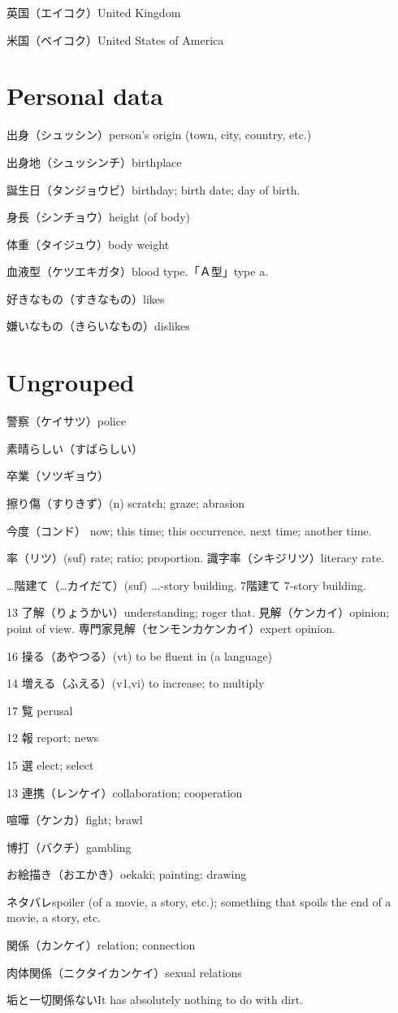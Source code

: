 英国（エイコク）United Kingdom

米国（ベイコク）United States of America

\section{Personal data}

出身（シュッシン）person's origin (town, city, country, etc.)

出身地（シュッシンチ）birthplace

誕生日（タンジョウビ）birthday; birth date; day of birth.

身長（シンチョウ）height (of body)

体重（タイジュウ）body weight

血液型（ケツエキガタ）blood type.「Ａ型」type a.

好きなもの（すきなもの）likes

嫌いなもの（きらいなもの）dislikes

\section{Ungrouped}

警察（ケイサツ）police

素晴らしい（すばらしい）

卒業（ソツギョウ）

擦り傷（すりきず）(n) scratch; graze; abrasion

今度（コンド）
now; this time; this occurrence.
next time; another time.

率（リツ）(suf) rate; ratio; proportion.
識字率（シキジリツ）literacy rate.

…階建て（…カイだて）(suf) ...-story building.
7階建て 7-story building.

13
了解（りょうかい）understanding; roger that.
見解（ケンカイ）opinion; point of view.
専門家見解（センモンカケンカイ）expert opinion.

16 操る（あやつる）(vt) to be fluent in (a language)

14 増える（ふえる）(v1,vi) to increase; to multiply

17 覧 perusal

12 報 report; news

15 選 elect; select

13 連携（レンケイ）collaboration; cooperation

喧嘩（ケンカ）fight; brawl

博打（バクチ）gambling

お絵描き（おエかき）oekaki; painting; drawing

ネタバレspoiler (of a movie, a story, etc.); something that spoils the end of a movie, a story, etc.

関係（カンケイ）relation; connection

肉体関係（ニクタイカンケイ）sexual relations

垢と一切関係ないIt has absolutely nothing to do with dirt.
